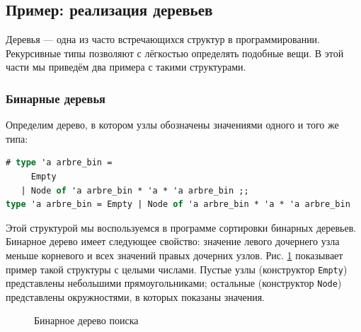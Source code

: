 \subsection{Пример: реализация деревьев}

Деревья --- одна из часто встречающихся структур в программировании. Рекурсивные
типы позволяют с лёгкостью определять подобные вещи. В этой части мы приведём
два примера с такими структурами.

\subsubsection{Бинарные деревья}

Определим дерево, в котором узлы обозначены значениями одного и того же типа:

\begin{lstlisting}[language=OCaml]
# type 'a arbre_bin =
     Empty
   | Node of 'a arbre_bin * 'a * 'a arbre_bin ;;
type 'a arbre_bin = Empty | Node of 'a arbre_bin * 'a * 'a arbre_bin
\end{lstlisting}

Этой структурой мы воспользуемся в программе сортировки бинарных деревьев.
Бинарное дерево имеет следующее свойство: значение левого дочернего узла меньше
корневого и всех значений правых дочерних узлов. Рис. \ref{fig:bin_search_tree}
показывает пример такой структуры с целыми числами. Пустые узлы (конструктор
\texttt{Empty}) представлены небольшими прямоугольниками; остальные (конструктор
\texttt{Node}) представлены окружностями, в которых показаны значения.

\begin{figure}[h]
	\caption{Бинарное дерево поиска}
	\label{fig:bin_search_tree}
\end{figure}

